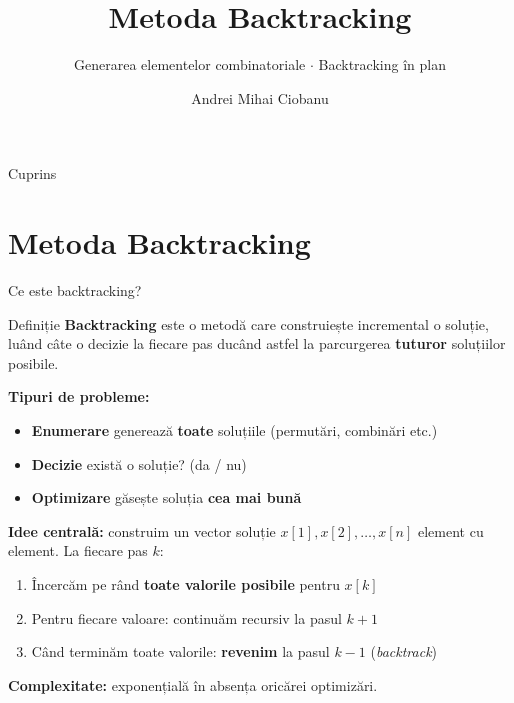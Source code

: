 ﻿\documentclass[10pt]{beamer}
\title{Metoda Backtracking}
\subtitle{Generarea elementelor combinatoriale $\cdot$ Backtracking în plan}
\author{Andrei Mihai Ciobanu}
\institute{Algolymp Summer School}
\date{}
\begin{document}
\begin{frame}\titlepage\end{frame}

\begin{frame}{Cuprins}\tableofcontents\end{frame}

\section{Metoda Backtracking}

\begin{frame}{Ce este backtracking?}
  \begin{block}{Definiție}
    \textbf{Backtracking} este o metodă care construiește incremental o soluție,
    luând câte o decizie la fiecare pas \textemdash{} ducând astfel la parcurgerea
    \textbf{tuturor} soluțiilor posibile.
  \end{block}
  \smallskip
  \textbf{Tipuri de probleme:}
  \begin{itemize}\itemsep2pt
    \item \textbf{Enumerare} \textemdash{} generează \textbf{toate} soluțiile (permutări, combinări etc.)
    \item \textbf{Decizie} \textemdash{} există o soluție? (da / nu)
    \item \textbf{Optimizare} \textemdash{} găsește soluția \textbf{cea mai bună}
  \end{itemize}
  \smallskip
  \textbf{Idee centrală:} construim un vector soluție $x[1], x[2], \ldots, x[n]$
  element cu element. La fiecare pas $k$:
  \begin{enumerate}\itemsep1pt
    \item Încercăm pe rând \textbf{toate valorile posibile} pentru $x[k]$
    \item Pentru fiecare valoare: continuăm recursiv la pasul $k+1$
    \item Când terminăm toate valorile: \textbf{revenim} la pasul $k-1$ (\textit{backtrack})
  \end{enumerate}
  \smallskip
  \textbf{Complexitate:} exponențială \textemdash{} în absența oricărei optimizări.
\end{frame}
\end{document}
